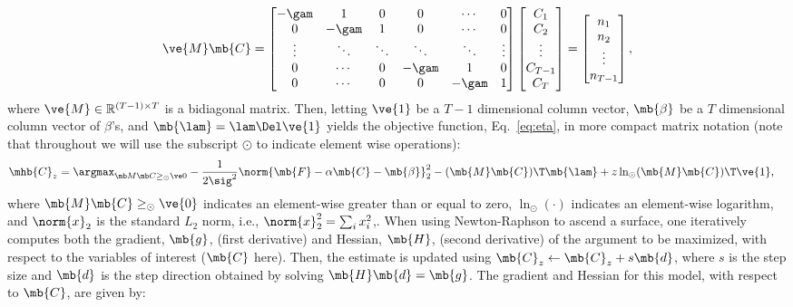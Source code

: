 \begin{align} \label{eq:M}
\ve{M} \mb{C} = %
\begin{bmatrix}
-\gam & 1 & 0 & 0 & \cdots & 0 \\
0 & -\gam & 1 & 0 & \cdots  & 0 \\
\vdots & \ddots & \ddots & \ddots & \ddots & \vdots  \\
0 & \cdots & 0  & -\gam & 1 & 0 \\
0 & \cdots & 0 & 0 & -\gam & 1
\end{bmatrix}
\begin{bmatrix}
C_1 \\ C_2 \\  \vdots \\ C_{T-1} \\ C_T
\end{bmatrix}
= 
\begin{bmatrix}
n_1 \\ n_2 \\ \vdots  \\ n_{T-1}
\end{bmatrix}
, %
\end{align}
\noindent where $\ve{M} \in \mathbb{R}^{(T-1) \times T}$ is a bidiagonal matrix.  Then, letting $\ve{1}$ be a $T-1$ dimensional column vector, $\mb{\beta}$ be a $T$ dimensional column vector of $\beta$'s, and $\mb{\lam}=\lam \Del \ve{1}$ yields the objective function, Eq.~\eqref{eq:eta}, in more compact matrix notation (note that throughout we will use the subscript $\odot$ to indicate element wise operations):
\begin{align} 
\mhb{C}_{\zzz} 
&= \az  -\frac{1}{2 \sig^2} \norm{\mb{F} - \alpha \mb{C} -\mb{\beta}}_2^2 - (\mb{M} \mb{C} )\T \mb{\lam}  + \zzz \ln_\odot(\mb{M} \mb{C})\T\ve{1},  \label{eq:eta3}
\end{align}
\noindent where  $\mb{M} \mb{C} \geq_\odot \ve{0}$ indicates an element-wise greater than or equal to zero, $\ln_\odot(\cdot)$ indicates an element-wise logarithm, and $\norm{x}_2$ is the standard $L_2$ norm, i.e., $\norm{x}_2^2=\sum_i x_i^2$,. When using Newton-Raphson to ascend a surface, one iteratively computes both the gradient, $\mb{g}$, (first derivative) and Hessian, $\mb{H}$, (second derivative) of the argument to be maximized, with respect to the variables of interest ($\mb{C}$ here).  Then, the estimate is updated using $\mb{C}_z \leftarrow \mb{C}_z + s \mb{d}$, where $s$ is the step size and $\mb{d}$ is the step direction obtained by solving $\mb{H} \mb{d} = \mb{g}$.  The gradient and Hessian for this model, with respect to $\mb{C}$, are given by:

